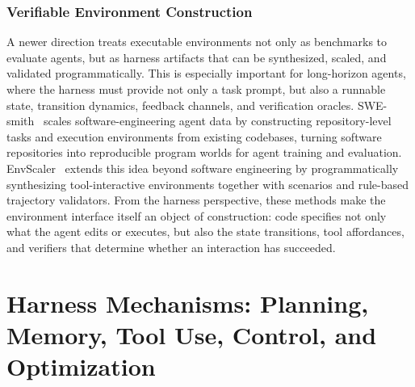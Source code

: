 \documentclass{llmxive}
\begin{document}
\subsubsection{Verifiable Environment Construction}
A newer direction treats executable environments not only as
benchmarks to evaluate agents, but as harness artifacts that can
be synthesized, scaled, and validated programmatically. This is
especially important for long-horizon agents, where the harness
must provide not only a task prompt, but also a runnable state,
transition dynamics, feedback channels, and verification oracles.
SWE-smith~\cite{yang2025swesmithscalingdatasoftware} scales
software-engineering agent data by constructing repository-level
tasks and execution environments from existing codebases, turning
software repositories into reproducible program worlds for agent
training and evaluation. EnvScaler~\cite{song2026envscalerscalingtoolinteractiveenvironments}
extends this idea beyond software engineering by programmatically
synthesizing tool-interactive environments together with scenarios
and rule-based trajectory validators. From the harness perspective,
these methods make the environment interface itself an object of
construction: code specifies not only what the agent edits or
executes, but also the state transitions, tool affordances, and
verifiers that determine whether an interaction has succeeded.




\section{Harness Mechanisms: Planning, Memory, Tool Use, Control, and Optimization}
\label{sec:modules}
\end{document}
